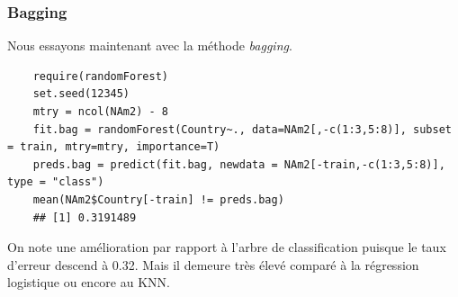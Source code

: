 \documentclass[12pt,a4paper]{article}
\begin{document}
\subsubsection{Bagging}
Nous essayons maintenant avec la méthode \textit{bagging}.\vspace{2mm}
\begin{lstlisting}
	require(randomForest)
	set.seed(12345)
	mtry = ncol(NAm2) - 8
	fit.bag = randomForest(Country~., data=NAm2[,-c(1:3,5:8)], subset = train, mtry=mtry, importance=T)
	preds.bag = predict(fit.bag, newdata = NAm2[-train,-c(1:3,5:8)], type = "class")
	mean(NAm2$Country[-train] != preds.bag)
	## [1] 0.3191489
\end{lstlisting}
On note une amélioration par rapport à l'arbre de classification puisque le taux d'erreur descend à 0.32. Mais il demeure très élevé comparé à la régression logistique ou encore au KNN.
\end{document}
